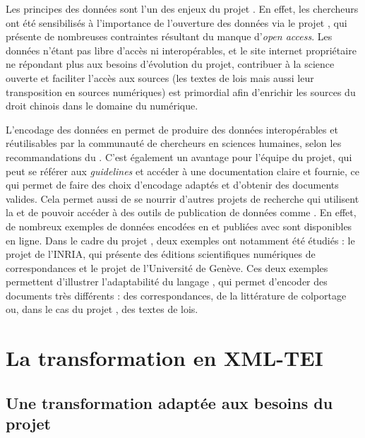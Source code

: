 Les principes \fair des données sont l'un des enjeux du projet \COREL. En effet, les chercheurs ont été sensibilisés à l'importance de l'ouverture des données via le projet \LSC, qui présente de nombreuses contraintes résultant du manque d'\textit{open access}. Les données \XML n'étant pas libre d'accès ni interopérables, et le site internet propriétaire ne répondant plus aux besoins d'évolution du projet, contribuer à la science ouverte et faciliter l'accès aux sources (les textes de lois mais aussi leur transposition en sources numériques) est primordial afin d'enrichir les sources du droit chinois dans le domaine du numérique. 

L'encodage des données en \TEI permet de produire des données interopérables et réutilisables par la communauté de chercheurs en sciences humaines, selon les recommandations du \w. C'est également un avantage pour l'équipe du projet, qui peut se référer aux \textit{guidelines} et accéder à une documentation claire et fournie, ce qui permet de faire des choix d'encodage adaptés et d'obtenir des documents \TEI valides. Cela permet aussi de se nourrir d'autres projets de recherche qui utilisent la \TEI et de pouvoir accéder à des outils de publication de données comme \tp. En effet, de nombreux exemples de données encodées en \TEI et publiées avec \tp sont disponibles en ligne. Dans le cadre du projet \COREL, deux exemples ont notamment été étudiés : le projet \disco de l'INRIA, qui présente des éditions scientifiques numériques de correspondances et le projet \cordel de l'Université de Genève. Ces deux exemples permettent d'illustrer l'adaptabilité du langage \TEI, qui permet d'encoder des documents très différents : des correspondances, de la littérature de colportage ou, dans le cas du projet \COREL, des textes de lois. 

 \section{La transformation en XML-TEI}
    \subsection{Une transformation adaptée aux besoins du projet}
    

